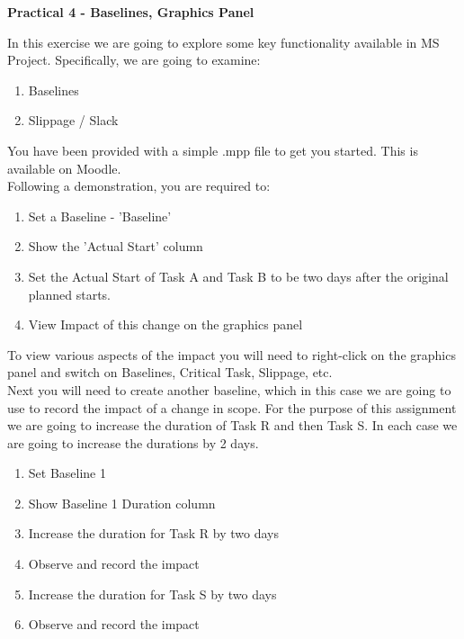 


\begin{flushleft}
\Large\textbf{Practical 4 - Baselines, Graphics Panel}\\
\end{flushleft}

In this exercise we are going to explore some key functionality available in MS Project.  Specifically, we are going to examine:

\begin{enumerate}
	\item Baselines
	\item Slippage / Slack
\end{enumerate}

You have been provided with a simple .mpp file to get you started.  This is available on Moodle.\\
Following a demonstration, you are required to:

\begin{enumerate}
	\item Set a Baseline - 'Baseline'
	\item Show the 'Actual Start' column
	\item Set the Actual Start of Task A and Task B to be two days after the original planned starts.
	\item View Impact of this change on the graphics panel
\end{enumerate}

To view various aspects of the impact you will need to right-click on the graphics panel and switch on Baselines, Critical Task, Slippage, etc.\\

Next you will need to create another baseline, which in this case we are going to use to record the impact of a change in scope.  For the purpose of this assignment we are going to increase the duration of Task R and then Task S.  In each case we are going to increase the durations by 2 days.

\begin{enumerate}
	\item Set Baseline 1
	\item Show Baseline 1 Duration column
	\item Increase the duration for Task R by two days
	\item Observe and record the impact
	\item Increase the duration for Task S by two days
	\item Observe and record the impact
\end{enumerate}


